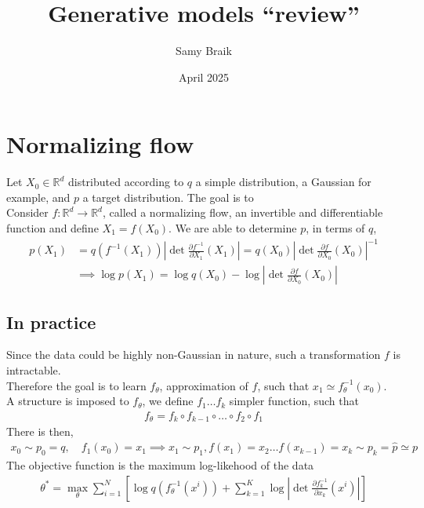 \documentclass{article}
\title{Generative models ``review''}
\author{Samy Braik}
\date{April 2025}
\begin{document}
\maketitle

\section{Normalizing flow}
Let $X_0\in\mathbb{R}^d$ distributed according to $q$ a simple distribution, a Gaussian for example, and $p$ a target distribution.  The goal is to 
\\
Consider $f:\mathbb{R}^d\rightarrow\mathbb{R}^d$, called a normalizing flow, an invertible and differentiable function and define $X_1=f(X_0)$. 
We are able to determine \(p\), in terms of \(q\), 
\begin{align}
    p(X_1)&=q(f^{-1}(X_1))\left| \det\frac{\partial f^{-1}}{\partial X_1}(X_1) \right| = q(X_0)\left| \det \frac{\partial f}{\partial X_0}(X_0) \right|^{-1} \\
    &\implies \log p(X_1)=\log q(X_0) - \log \left|  \det \frac{\partial f}{\partial X_0}(X_0) \right|  
\end{align}
\subsection{In practice}
Since the data could be highly non-Gaussian in nature, such a transformation $f$ is intractable.\\
Therefore the goal is to learn $f_\theta$, approximation of $f$, such that $x_1 \simeq f_\theta^{-1}(x_0)$. \\
A structure is imposed to $f_\theta$, we define $f_1\ldots f_k$ simpler function,  such that
\begin{align}
    f_\theta = f_k\circ f_{k-1}\circ\ldots\circ f_2\circ f_1
\end{align}
There is then, 
\begin{align}
    x_0\sim p_0=q, \quad f_1(x_0) = x_1 \implies x_1\sim p_1, f(x_1)=x_2 \ldots f(x_{k-1})=x_k \sim p_k = \hat{p} \simeq p
\end{align}
The objective function is the maximum log-likehood of the data
\begin{align}
    \theta^* = \max_{\theta} \sum_{i=1}^N \left[ \log q(f_\theta^{-1}(x^i)) + \sum_{k=1}^K \log \left| \det\frac{\partial f_k^{-1}}{\partial x_k}(x^i) \right| \right] 
\end{align}
\end{document}
